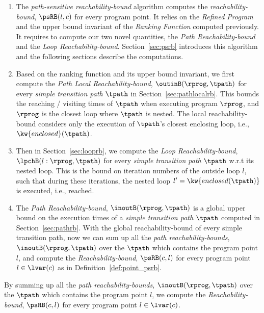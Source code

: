 \begin{enumerate}
\item The \emph{path-sensitive reachability-bound} algorithm computes the \emph{reachability-bound}, $\psRB(l, c)$ for every program point.
It relies on the \emph{Refined Program} and the upper bound invariant of the \emph{Ranking Function} computed previously.
It requires to compute our two novel quantities, the \emph{Path Reachability-bound} and the \emph{Loop Reachability-bound}.
Section~\ref{sec:psrb} introduces this algorithm and the following sections describe the computations. 
    \item Based on the ranking function and its upper bound invariant, we first compute the \emph{Path Local Reachability-bound}, $\outinB(\rprog, \tpath)$ for every \emph{simple transition path} $\tpath$ in Section~\ref{sec:pathlocalrb}. 
    This bounds the reaching / visiting times of $\tpath$ when executing program $\rprog$, and $\rprog$ is the closest loop where $\tpath$ is nested.
    The local reachability-bound  considers only the execution of $\tpath$'s closest enclosing loop, i.e., $\kw{enclosed}(\tpath)$.
    \item Then in Section~\ref{sec:looprb}, we compute the \emph{Loop Reachability-bound}, $\lpchB(l: \rprog, \tpath)$ for every \emph{simple transition path} $\tpath$
    w.r.t its nested loop. 
    This is the bound on iteration numbers of the outside loop $l$,
    such that during these iterations, the nested loop $l' = \kw{enclosed(\tpath)}$ is executed, i.e., reached.
    \item The \emph{Path Reachability-bound}, $\inoutB(\rprog, \tpath)$  is a global upper bound on the execution times of a \emph{simple transition path} $\tpath$ computed in Section~\ref{sec:pathrb}.
    With the global reachability-bound of every simple transition path, now we can sum up all the \emph{path reachability-bounds}, $\inoutB(\rprog, \tpath)$ over the $\tpath$ which contains the program point $l$, and compute the \emph{Reachability-bound}, $\psRB(c, l)$ for every program point $l \in \lvar(c)$ as in Definition~\ref{def:point_psrb}.
\end{enumerate}
By summing up all the \emph{path reachability-bounds}, $\inoutB(\rprog, \tpath)$ over the $\tpath$ which contains the program point $l$, we compute the \emph{Reachability-bound}, $\psRB(c, l)$ for every program point $l \in \lvar(c)$.